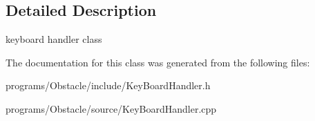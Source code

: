 \subsection{Detailed Description}
keyboard handler class 

The documentation for this class was generated from the following files\+:\begin{DoxyCompactItemize}
\item 
programs/\+Obstacle/include/Key\+Board\+Handler.\+h\item 
programs/\+Obstacle/source/Key\+Board\+Handler.\+cpp\end{DoxyCompactItemize}
